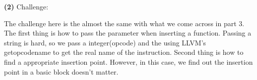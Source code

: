 \documentclass[11pt]{article}
\renewcommand{\part}[1] {\vspace{.10in} {\bf (#1)}}
\begin{document}
\part{2} Challenge:

The challenge here is the almost the same with what we come across in part 3. The first thing is how to pass the parameter when inserting a function. Passing a string is hard, so we pass a integer(opcode) and the using LLVM's getopcodename to get the real name of the instruction. Second thing is how to find a appropriate insertion point. However, in this case, we find out the insertion point in a basic block doesn't matter.



\end{document}
